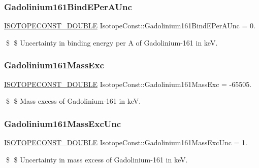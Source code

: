 \subsubsection{\texorpdfstring{Gadolinium161\+Bind\+E\+Per\+A\+Unc}{Gadolinium161BindEPerAUnc}}
{\footnotesize\ttfamily \mbox{\hyperlink{group___isotope_const-_macros_ga8f45a7272ce02c0b4c65c44636ed719a}{I\+S\+O\+T\+O\+P\+E\+C\+O\+N\+S\+T\+\_\+\+D\+O\+U\+B\+LE}} Isotope\+Const\+::\+Gadolinium161\+Bind\+E\+Per\+A\+Unc = 0.}

\$ \$ Uncertainty in binding energy per A of Gadolinium-\/161 in keV. \mbox{\label{group___isotope_const-_gadolinium-_gd161_ga3dbc60db72d9eb18e3264f8dfbe744fc}} 
\subsubsection{\texorpdfstring{Gadolinium161\+Mass\+Exc}{Gadolinium161MassExc}}
{\footnotesize\ttfamily \mbox{\hyperlink{group___isotope_const-_macros_ga8f45a7272ce02c0b4c65c44636ed719a}{I\+S\+O\+T\+O\+P\+E\+C\+O\+N\+S\+T\+\_\+\+D\+O\+U\+B\+LE}} Isotope\+Const\+::\+Gadolinium161\+Mass\+Exc = -\/65505.}

\$ \$ Mass excess of Gadolinium-\/161 in keV. \mbox{\label{group___isotope_const-_gadolinium-_gd161_ga9a40c77c3993e308690423bb4c05dbd7}} 
\subsubsection{\texorpdfstring{Gadolinium161\+Mass\+Exc\+Unc}{Gadolinium161MassExcUnc}}
{\footnotesize\ttfamily \mbox{\hyperlink{group___isotope_const-_macros_ga8f45a7272ce02c0b4c65c44636ed719a}{I\+S\+O\+T\+O\+P\+E\+C\+O\+N\+S\+T\+\_\+\+D\+O\+U\+B\+LE}} Isotope\+Const\+::\+Gadolinium161\+Mass\+Exc\+Unc = 1.}

\$ \$ Uncertainty in mass excess of Gadolinium-\/161 in keV. \mbox{\label{group___isotope_const-_gadolinium-_gd161_ga1596b934a0c984cea5d98f8467fef09e}} 

